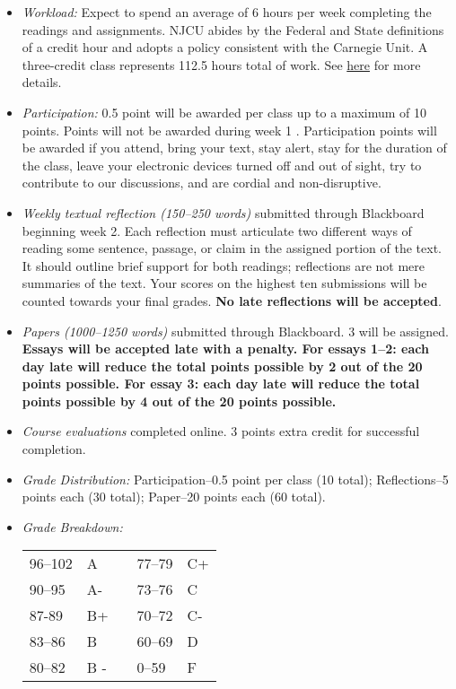 \documentclass[article,oneside]{memoir}
\begin{document}
\begin{itemize}
\item \textit{Workload:} Expect to spend an average of 6 hours per week completing the readings and assignments. NJCU abides by the Federal and State definitions of a credit hour and adopts a policy consistent with the Carnegie Unit. A three-credit class represents 112.5 hours total of work. See \href{http://scottoconnor.org/resources/Credit.pdf}{here} for more details.

\item \textit{Participation:} 0.5 point will be awarded per class up to a maximum of 10 points. Points will not be awarded during week 1 . Participation points will be awarded if you attend, bring your text, stay alert, stay for the duration of the class, leave your electronic devices turned off and out of sight, try to contribute to our discussions, and are cordial and non-disruptive. 


\item \textit{Weekly textual reflection (150--250 words)} submitted through Blackboard beginning week 2. Each reflection must articulate two different ways of reading some sentence, passage, or claim in the assigned portion of the text. It should outline brief support for both readings; reflections are not mere summaries of the text. Your scores on the highest ten submissions will be counted towards your final grades. \textbf{No late reflections will be accepted}.



\item \textit{Papers  (1000--1250 words) } submitted through Blackboard. 3 will be assigned. \textbf{Essays will be accepted late with a penalty. For essays 1--2: each day late will reduce the total points possible by 2 out of the 20 points possible. For essay 3: each day late will reduce the total points possible by 4 out of the 20 points possible.}  

\item \textit{Course evaluations} completed online. 3 points extra credit for successful completion.

\item \textit{Grade Distribution:} Participation--0.5 point per class (10 total); Reflections--5 points each (30 total); Paper--20 points each (60 total). 

\item \textit{Grade Breakdown:}

 \begin{tabular}{ | l | l | p{2cm} | l | l | }
    \hline 
96--102 & A  & &  77--79 &  C+ \\  
90--95 & A- & &  73--76 & C \\
87-89 & B+ &  &  70--72 & C- \\ 
83--86 & B  & &  60--69 & D\\
80--82 & B - & & 0--59 & F\\ \hline
    \end{tabular}


\end{itemize}
\end{document}
